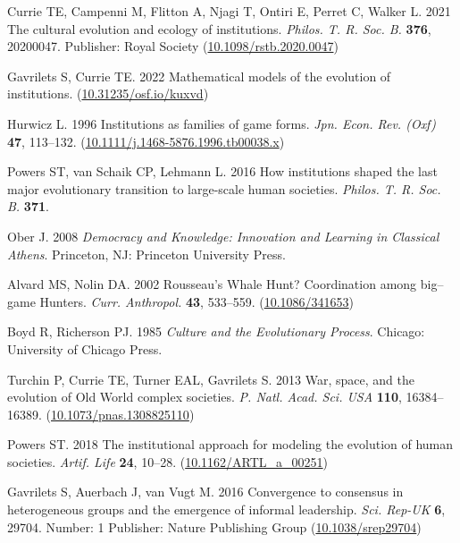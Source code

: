 \documentclass{rstb}
\begin{document}
\begin{thebibliography}{99}
Currie TE, Campenni M, Flitton A, Njagi T, Ontiri E, Perret C, Walker L. 2021
  The cultural evolution and ecology of institutions. {\em Philos. T. R. Soc. B.} \textbf{376},
  20200047.
Publisher: Royal Society
  (\href{http://dx.doi.org/10.1098/rstb.2020.0047}{10.1098/rstb.2020.0047})

Gavrilets S, Currie TE. 2022  Mathematical models of the evolution of
  institutions.
  (\href{http://dx.doi.org/10.31235/osf.io/kuxvd}{10.31235/osf.io/kuxvd})

Hurwicz L. 1996  Institutions as families of game forms. {\em Jpn. Econ. Rev.
  (Oxf)} \textbf{47}, 113--132.
(\href{http://dx.doi.org/10.1111/j.1468-5876.1996.tb00038.x}{10.1111/j.1468-5876.1996.tb00038.x})

Powers ST, van Schaik CP, Lehmann L. 2016  How institutions shaped the last
  major evolutionary transition to large-scale human societies. {\em Philos. T. R. Soc. B.} \textbf{371}.

Ober J. 2008 {\em Democracy and Knowledge: Innovation and Learning in Classical
  Athens}.
Princeton, NJ: Princeton University Press.

Alvard MS, Nolin DA. 2002  Rousseau's Whale Hunt? {Coordination} among
  {big--game} Hunters. {\em Curr. Anthropol.} \textbf{43}, 533--559.
(\href{http://dx.doi.org/10.1086/341653}{10.1086/341653})

Boyd R, Richerson PJ. 1985 {\em Culture and the Evolutionary Process}.
Chicago: University of Chicago Press.

Turchin P, Currie TE, Turner EAL, Gavrilets S. 2013  War, space, and the
  evolution of {Old World} complex societies. {\em P. Natl. Acad. Sci. USA}
  \textbf{110}, 16384--16389.
(\href{http://dx.doi.org/10.1073/pnas.1308825110}{10.1073/pnas.1308825110})

Powers ST. 2018  The institutional approach for modeling the evolution of human
  societies. {\em Artif. Life} \textbf{24}, 10--28.
  (\href{http://dx.doi.org/10.1162/ARTL\_a\_00251}{10.1162/ARTL\_a\_00251})

Gavrilets S, Auerbach J, van Vugt M. 2016  Convergence to consensus in
  heterogeneous groups and the emergence of informal leadership. {\em
  Sci. Rep-UK} \textbf{6}, 29704.
Number: 1 Publisher: Nature Publishing Group
  (\href{http://dx.doi.org/10.1038/srep29704}{10.1038/srep29704})


\end{thebibliography}
\end{document}
